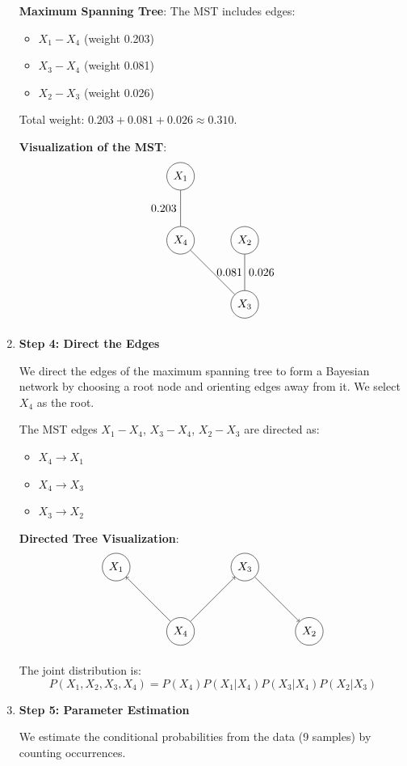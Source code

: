 \documentclass[a3paper,12pt]{extarticle} %
\begin{document}
\begin{enumerate}
\textbf{Maximum Spanning Tree}:
The MST includes edges:
\begin{itemize}
    \item \(X_1 - X_4\) (weight 0.203)
    \item \(X_3 - X_4\) (weight 0.081)
    \item \(X_2 - X_3\) (weight 0.026)
\end{itemize}
Total weight: \(0.203 + 0.081 + 0.026 \approx 0.310\).

\textbf{Visualization of the MST}:
\[
\begin{tikzpicture}
    \node[circle, draw] (X1) at (0,2) {$X_1$};
    \node[circle, draw] (X2) at (2,0) {$X_2$};
    \node[circle, draw] (X3) at (2,-2) {$X_3$};
    \node[circle, draw] (X4) at (0,0) {$X_4$};
    \draw (X1) -- (X4) node[midway, left] {0.203};
    \draw (X3) -- (X4) node[midway, right] {0.081};
    \draw (X2) -- (X3) node[midway, right] {0.026};
\end{tikzpicture}
\]
\item \textbf{Step 4: Direct the Edges}

We direct the edges of the maximum spanning tree to form a Bayesian network by choosing a root node and orienting edges away from it. We select \(X_4\) as the root.

The MST edges \(X_1 - X_4\), \(X_3 - X_4\), \(X_2 - X_3\) are directed as:
\begin{itemize}
    \item \(X_4 \to X_1\)
    \item \(X_4 \to X_3\)
    \item \(X_3 \to X_2\)
\end{itemize}

\textbf{Directed Tree Visualization}:
\[
\begin{tikzpicture}
    \node[circle, draw] (X4) at (0,0) {$X_4$};
    \node[circle, draw] (X1) at (-2,2) {$X_1$};
    \node[circle, draw] (X3) at (2,2) {$X_3$};
    \node[circle, draw] (X2) at (4,0) {$X_2$};
    \draw[->] (X4) -- (X1);
    \draw[->] (X4) -- (X3);
    \draw[->] (X3) -- (X2);
\end{tikzpicture}
\]

The joint distribution is:
\[
P(X_1, X_2, X_3, X_4) = P(X_4) P(X_1 | X_4) P(X_3 | X_4) P(X_2 | X_3)
\]

\item \textbf{Step 5: Parameter Estimation}

We estimate the conditional probabilities from the data (9 samples) by counting occurrences.


\end{enumerate}
\end{document}

